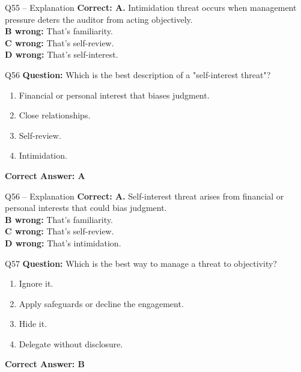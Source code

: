 \documentclass[aspectratio=169,10pt]{beamer}
\begin{document}
	\begin{frame}[t]{Q55 -- Explanation}
		\small
		\textbf{Correct: A.} Intimidation threat occurs when management pressure deters the auditor from acting objectively. \\[4pt]
		\textbf{B wrong:} That's familiarity. \\[2pt]
		\textbf{C wrong:} That's self-review. \\[2pt]
		\textbf{D wrong:} That's self-interest.
	\end{frame}
	
	\begin{frame}[t]{Q56}
		\small
		\textbf{Question:} Which is the best description of a "self-interest threat"?
		\begin{enumerate}[label=\Alph*.,itemsep=1pt,topsep=2pt]
			\item Financial or personal interest that biases judgment.
			\item Close relationships.
			\item Self-review.
			\item Intimidation.
		\end{enumerate}
		\vspace{4pt}
		\textbf{Correct Answer: A}
	\end{frame}
	
	\begin{frame}[t]{Q56 -- Explanation}
		\small
		\textbf{Correct: A.} Self-interest threat arises from financial or personal interests that could bias judgment. \\[4pt]
		\textbf{B wrong:} That's familiarity. \\[2pt]
		\textbf{C wrong:} That's self-review. \\[2pt]
		\textbf{D wrong:} That's intimidation.
	\end{frame}
	
	\begin{frame}[t]{Q57}
		\small
		\textbf{Question:} Which is the best way to manage a threat to objectivity?
		\begin{enumerate}[label=\Alph*.,itemsep=1pt,topsep=2pt]
			\item Ignore it.
			\item Apply safeguards or decline the engagement.
			\item Hide it.
			\item Delegate without disclosure.
		\end{enumerate}
		\vspace{4pt}
		\textbf{Correct Answer: B}
	\end{frame}
	
\end{document}
